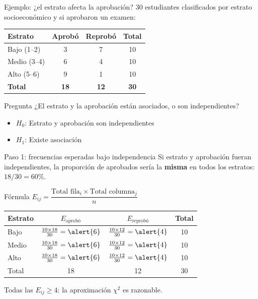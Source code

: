 \documentclass[aspectratio=169, 11pt]{beamer}
\begin{document}
\begin{frame}{Ejemplo: ¿el estrato afecta la aprobación?}
\small
30 estudiantes clasificados por estrato socioeconómico y si aprobaron un examen:

\vspace{0.2cm}
\begin{center}
\begin{tabular}{lccc}
\toprule
\textbf{Estrato} & \textbf{Aprobó} & \textbf{Reprobó} & \textbf{Total} \\
\midrule
Bajo (1--2) & 3 & 7 & 10 \\
Medio (3--4) & 6 & 4 & 10 \\
Alto (5--6) & 9 & 1 & 10 \\
\midrule
\textbf{Total} & \textbf{18} & \textbf{12} & \textbf{30} \\
\bottomrule
\end{tabular}
\end{center}

\vspace{0.2cm}
\begin{block}{Pregunta}
¿El estrato y la aprobación están \alert{asociados}, o son \alert{independientes}?
\begin{itemize}
  \item $H_0$: Estrato y aprobación son independientes
  \item $H_1$: Existe asociación
\end{itemize}
\end{block}
\end{frame}

\begin{frame}{Paso 1: frecuencias esperadas bajo independencia}
\small
Si estrato y aprobación fueran independientes, la proporción de aprobados sería la \textbf{misma} en todos los estratos: $18/30 = 60\%$.

\vspace{0.1cm}
\begin{block}{Fórmula}
$E_{ij} = \dfrac{\text{Total fila}_i \times \text{Total columna}_j}{n}$
\end{block}

\vspace{0.1cm}
\begin{center}
\begin{tabular}{lccc}
\toprule
\textbf{Estrato} & $E_{\text{aprobó}}$ & $E_{\text{reprobó}}$ & Total \\
\midrule
Bajo & $\frac{10 \times 18}{30} = \alert{6}$ & $\frac{10 \times 12}{30} = \alert{4}$ & 10 \\[4pt]
Medio & $\frac{10 \times 18}{30} = \alert{6}$ & $\frac{10 \times 12}{30} = \alert{4}$ & 10 \\[4pt]
Alto & $\frac{10 \times 18}{30} = \alert{6}$ & $\frac{10 \times 12}{30} = \alert{4}$ & 10 \\
\midrule
Total & 18 & 12 & 30 \\
\bottomrule
\end{tabular}
\end{center}

\small Todas las $E_{ij} \geq 4$: la aproximación $\chi^2$ es razonable.
\end{frame}
\end{document}
